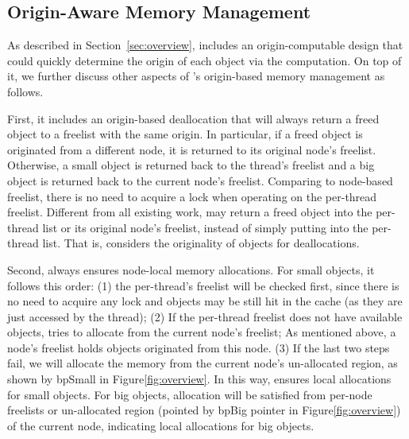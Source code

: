 \subsection{Origin-Aware Memory Management} 
\label{sec:origin}


As described in Section~\ref{sec:overview}, \NM{} includes an origin-computable design that could quickly determine the origin of each object via the computation. On top of it, we further discuss other aspects of \NM{}'s origin-based memory management as follows.  

First, it includes an origin-based deallocation that will always return a freed object to a freelist with the same origin. In particular, if a freed object is originated from a different node, it is returned to its original node's  freelist. Otherwise, a small object is returned back to the thread's freelist and a big object is returned back to the current node's freelist. Comparing to node-based freelist, there is no need to acquire a lock when operating on the per-thread freelist. Different from all existing work, \NM{} may return a freed object into the per-thread list or its original node's freelist, instead of simply putting into the per-thread list. That is, \NM{} considers the originality of objects for deallocations.   

Second, \NM{} always ensures node-local memory allocations. For small objects, it follows this order: (1) the per-thread's freelist will be checked first, since there is no need to acquire any lock and objects may be still hit in the cache (as they are just accessed by the thread); (2) If the per-thread freelist does not have available objects, \NM{} tries to allocate from the current node's freelist; As mentioned above, a node's freelist holds objects originated from this node. (3) If the last two steps fail,  we will allocate the memory from the current node's un-allocated region, as shown by bpSmall in Figure\ref{fig:overview}. In this way, 
\NM{} ensures local allocations for small objects. For big objects, allocation will be satisfied from per-node freelists or un-allocated region (pointed by bpBig pointer in Figure\ref{fig:overview}) of the current node, indicating local allocations for big objects. 


